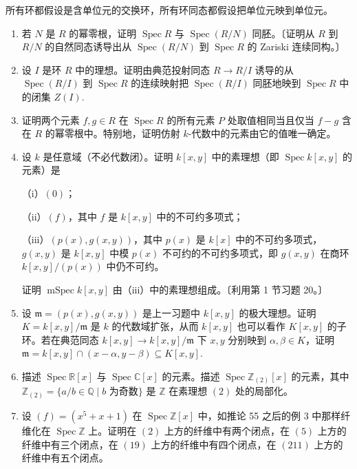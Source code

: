 所有环都假设是含单位元的交换环，所有环同态都假设把单位元映到单位元。

\begin{enumerate}
\item 若 \(N\) 是 \(R\) 的幂零根，证明 \(\operatorname{Spec}R\) 与 \(\operatorname{Spec}(R/N)\) 同胚。〔证明从 \(R\) 到 \(R/N\) 的自然同态诱导出从 \(\operatorname{Spec}(R/N)\) 到 \(\operatorname{Spec}R\) 的 Zariski 连续同构。〕

\item 设 \(I\) 是环 \(R\) 中的理想。证明由典范投射同态 \(R \to R/I\) 诱导的从 \(\operatorname{Spec}(R/I)\) 到 \(\operatorname{Spec}R\) 的连续映射把 \(\operatorname{Spec}(R/I)\) 同胚地映到 \(\operatorname{Spec}R\) 中的闭集 \(Z(I)\).

\item 证明两个元素 \(f, g \in R\) 在 \(\operatorname{Spec}R\) 的所有元素 \(P\) 处取值相同当且仅当 \(f-g\) 含在 \(R\) 的幂零根中。特别地，证明仿射 \(k\)-代数中的元素由它的值唯一确定。

\item 设 \(k\) 是任意域（不必代数闭）。证明 \(k[x,y]\) 中的素理想（即 \(\operatorname{Spec}k[x,y]\) 的元素）是

（i）\((0)\)；

（ii）\((f)\)，其中 \(f\) 是 \(k[x,y]\) 中的不可约多项式；

（iii）\((p(x), g(x,y))\)，其中 \(p(x)\) 是 \(k[x]\) 中的不可约多项式，\(g(x,y)\) 是 \(k[x,y]\) 中模 \(p(x)\) 不可约的不可约多项式，即 \(g(x,y)\) 在商环 \(k[x,y]/(p(x))\) 中仍不可约。

证明 \(\operatorname{mSpec}k[x,y]\) 由（iii）中的素理想组成。〔利用第 1 节习题 20。〕

\item 设 \(\mathfrak{m} = (p(x), g(x,y))\) 是上一习题中 \(k[x,y]\) 的极大理想。证明 \(K = k[x,y]/\mathfrak{m}\) 是 \(k\) 的代数域扩张，从而 \(k[x,y]\) 也可以看作 \(K[x,y]\) 的子环。若在典范同态 \(k[x,y] \to k[x,y]/\mathfrak{m}\) 下 \(x, y\) 分别映到 \(\alpha, \beta \in K\)，证明 \(\mathfrak{m} = k[x,y] \cap (x-\alpha, y-\beta) \subseteq K[x,y]\).

\item 描述 \(\operatorname{Spec}\mathbb{R}[x]\) 与 \(\operatorname{Spec}\mathbb{C}[x]\) 的元素。描述 \(\operatorname{Spec}\mathbb{Z}_{(2)}[x]\) 的元素，其中 \(\mathbb{Z}_{(2)} = \{a/b \in \mathbb{Q} \mid b \text{ 为奇数}\}\) 是 \(\mathbb{Z}\) 在素理想 \((2)\) 处的局部化。

\item 设 \((f) = (x^5+x+1)\) 在 \(\operatorname{Spec}\mathbb{Z}[x]\) 中，如推论 55 之后的例 3 中那样纤维化在 \(\operatorname{Spec}\mathbb{Z}\) 上。证明在 \((2)\) 上方的纤维中有两个闭点，在 \((5)\) 上方的纤维中有三个闭点，在 \((19)\) 上方的纤维中有四个闭点，在 \((211)\) 上方的纤维中有五个闭点。


\end{enumerate}
